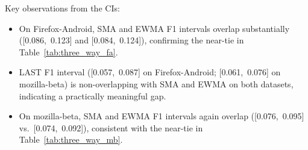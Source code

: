 \documentclass[pdflatex,sn-nature]{sn-jnl}
\theoremstyle{thmstyleone}%
\begin{document}
\begin{table}[tbp]
\centering
{}
\caption{Bootstrap 95\% confidence intervals (2{,}000 resamples) on the
  canonical (60\%/20\%/20\%, $n=342$ signatures) per-signature test-set
  scores for Firefox-Android.}
\label{tab:can_ci_fa}
\end{table}

\begin{table}[tbp]
\centering
{}
\caption{Bootstrap 95\% confidence intervals (2{,}000 resamples) on the
  canonical (60\%/20\%/20\%, $n=1{,}477$ signatures) per-signature test-set
  scores for mozilla-beta.}
\label{tab:can_ci_mb}
\end{table}

Key observations from the CIs:
\begin{itemize}
  \item On Firefox-Android, SMA and EWMA F1 intervals overlap substantially
    ([0.086,~0.123] and [0.084,~0.124]), confirming the near-tie in
    Table~\ref{tab:three_way_fa}.
  \item LAST F1 interval ([0.057,~0.087] on Firefox-Android;
    [0.061,~0.076] on mozilla-beta) is non-overlapping with SMA and EWMA
    on both datasets, indicating a practically meaningful gap.
  \item On mozilla-beta, SMA and EWMA F1 intervals again overlap
    ([0.076,~0.095] vs.\ [0.074,~0.092]), consistent with the
    near-tie in Table~\ref{tab:three_way_mb}.
\end{itemize}
\end{document}
